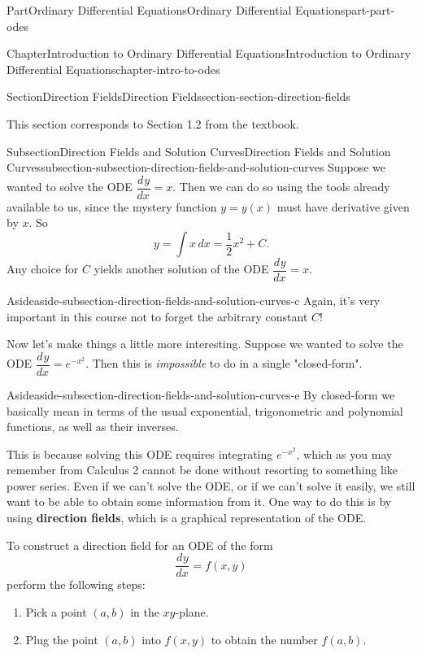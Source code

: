 \documentclass[twoside,10pt,]{book}
\newcommand{\terminology}[1]{\textbf{#1}}
\numberwithin{equation}{part}
\newcommand{\dv}[3][]{\dfrac{d^{#1} #2}{d #3^{#1}}}
\begin{document}
\begin{partptx}{Part}{Ordinary Differential Equations}{}{Ordinary Differential Equations}{}{}{part-part-odes}
\begin{chapterptx}{Chapter}{Introduction to Ordinary Differential Equations}{}{Introduction to Ordinary Differential Equations}{}{}{chapter-intro-to-odes}
\begin{sectionptx}{Section}{Direction Fields}{}{Direction Fields}{}{}{section-section-direction-fields}
\begin{introduction}{}
This section corresponds to Section 1.2 from the textbook.%
\end{introduction}%
%
%
\typeout{************************************************}
\typeout{************************************************}
%
\begin{subsectionptx}{Subsection}{Direction Fields and Solution Curves}{}{Direction Fields and Solution Curves}{}{}{subsection-subsection-direction-fields-and-solution-curves}
Suppose we wanted to solve the ODE \(\dv{y}{x} = x\). Then we can do so using the tools already available to us, since the mystery function \(y=y(x)\) must have derivative given by \(x\). So%
\begin{equation*}
y = \int x\,dx = \frac{1}{2}x^{2}+C.
\end{equation*}
Any choice for \(C\) yields another solution of the ODE \(\dv{y}{x} = x\).%
\begin{aside}{Aside}{}{aside-subsection-direction-fields-and-solution-curves-c}%
Again, it's very important in this course not to forget the arbitrary constant \(C\)!%
\end{aside}
Now let's make things a little more interesting. Suppose we wanted to solve the ODE \(\dv{y}{x} = e^{-x^{2}}\). Then this is \emph{impossible} to do in a single "closed-form".%
\begin{aside}{Aside}{}{aside-subsection-direction-fields-and-solution-curves-e}%
By closed-form we basically mean in terms of the usual exponential, trigonometric and polynomial functions, as well as their inverses.%
\end{aside}
This is because solving this ODE requires integrating \(e^{-x^{2}}\), which as you may remember from Calculus 2 cannot be done without resorting to something like power series. Even if we can't solve the ODE, or if we can't solve it easily, we still want to be able to obtain some information from it. One way to do this is by using \terminology{direction fields}, which is a graphical representation of the ODE.%
\par
To construct a direction field for an ODE of the form%
\begin{equation*}
\dv{y}{x} = f(x,y)
\end{equation*}
perform the following steps:%
\begin{enumerate}
\item{}Pick a point \((a,b)\) in the \(xy\)-plane.%
\item{}Plug the point \((a,b)\) into \(f(x,y)\) to obtain the number \(f(a,b)\).%

\end{enumerate}
\end{subsectionptx}
\end{sectionptx}
\end{chapterptx}
\end{partptx}
\end{document}
